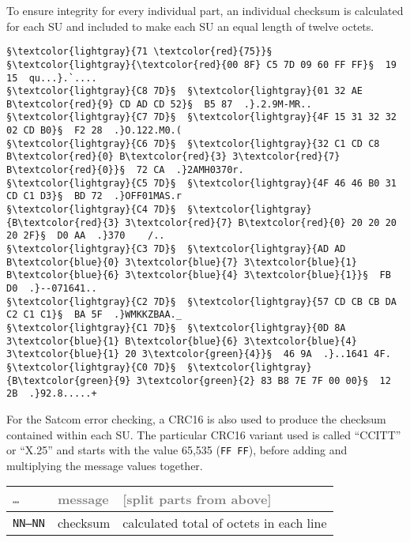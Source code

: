 \documentclass[tikz,a4paper,12pt]{article}
\begin{document}
To ensure integrity for every individual part, an individual checksum is calculated
for each \acrfull{SU} and included to make each \acrlong{SU} an equal length of
twelve octets.
\vfill
\begin{lstlisting}[language=SATCOM,numbers=none]
§\textcolor{lightgray}{71 \textcolor{red}{75}}§  §\textcolor{lightgray}{\textcolor{red}{00 8F} C5 7D 09 60 FF FF}§  19 15  qu...}.`....
§\textcolor{lightgray}{C8 7D}§  §\textcolor{lightgray}{01 32 AE B\textcolor{red}{9} CD AD CD 52}§  B5 87  .}.2.9M-MR..
§\textcolor{lightgray}{C7 7D}§  §\textcolor{lightgray}{4F 15 31 32 32 02 CD B0}§  F2 28  .}O.122.M0.(
§\textcolor{lightgray}{C6 7D}§  §\textcolor{lightgray}{32 C1 CD C8 B\textcolor{red}{0} B\textcolor{red}{3} 3\textcolor{red}{7} B\textcolor{red}{0}}§  72 CA  .}2AMH0370r.
§\textcolor{lightgray}{C5 7D}§  §\textcolor{lightgray}{4F 46 46 B0 31 CD C1 D3}§  BD 72  .}OFF01MAS.r
§\textcolor{lightgray}{C4 7D}§  §\textcolor{lightgray}{B\textcolor{red}{3} 3\textcolor{red}{7} B\textcolor{red}{0} 20 20 20 20 2F}§  D0 AA  .}370    /..
§\textcolor{lightgray}{C3 7D}§  §\textcolor{lightgray}{AD AD B\textcolor{blue}{0} 3\textcolor{blue}{7} 3\textcolor{blue}{1} B\textcolor{blue}{6} 3\textcolor{blue}{4} 3\textcolor{blue}{1}}§  FB D0  .}--071641..
§\textcolor{lightgray}{C2 7D}§  §\textcolor{lightgray}{57 CD CB CB DA C2 C1 C1}§  BA 5F  .}WMKKZBAA._
§\textcolor{lightgray}{C1 7D}§  §\textcolor{lightgray}{0D 8A 3\textcolor{blue}{1} B\textcolor{blue}{6} 3\textcolor{blue}{4} 3\textcolor{blue}{1} 20 3\textcolor{green}{4}}§  46 9A  .}..1641 4F.
§\textcolor{lightgray}{C0 7D}§  §\textcolor{lightgray}{B\textcolor{green}{9} 3\textcolor{green}{2} 83 B8 7E 7F 00 00}§  12 2B  .}92.8.....+
\end{lstlisting}

For the Satcom error checking, a \acrlong{CRC16} is also used to produce the checksum
contained within each \acrlong{SU}.  The particular \gls{CRC16} variant used is called ``CCITT'' or ``X.25''
and starts with the value 65,535 (\texttt{FF\,FF}), before adding and multiplying the message values together.

\begin{center}
\begin{tabular}{p{1.5cm}p{2cm}p{8cm}}
\hfill\textcolor{gray}{\texttt{\ldots}}&\textcolor{gray}{message}&\textcolor{gray}{[split parts from above]}\\
\hline
\hfill\texttt{NN--NN}&checksum&calculated total of octets in each line\\
\end{tabular}
\end{center}
\end{document}
